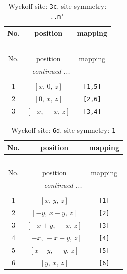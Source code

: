 \documentclass[fleqn,8pt]{jsarticle}
\begin{document}
\begin{longtable}{ccc}
\caption{Wyckoff site: {\tt 3c}, site symmetry: {\tt ..m'}}
 \\
 \hline \hline
No. & position & mapping \\ \hline \endfirsthead

\multicolumn{2}{l}{\tablename\ \thetable{}} \\
 \hline \hline
No. & position & mapping \\ \hline \endhead

 \hline \hline
\multicolumn{2}{r}{\footnotesize\it continued ...} \\ \endfoot

 \hline \hline
\multicolumn{2}{r}{} \\ \endlastfoot

1 & $\left[ x,\, 0,\, z \right]$ & {\tt [1,5]} \\ \hline
2 & $\left[ 0,\, x,\, z \right]$ & {\tt [2,6]} \\ \hline
3 & $\left[ - x,\, - x,\, z \right]$ & {\tt [3,4]} \\
\end{longtable}
\renewcommand{\arraystretch}{1.2}
\begin{longtable}{ccc}
\caption{Wyckoff site: {\tt 6d}, site symmetry: {\tt 1}}
 \\
 \hline \hline
No. & position & mapping \\ \hline \endfirsthead

\multicolumn{2}{l}{\tablename\ \thetable{}} \\
 \hline \hline
No. & position & mapping \\ \hline \endhead

 \hline \hline
\multicolumn{2}{r}{\footnotesize\it continued ...} \\ \endfoot

 \hline \hline
\multicolumn{2}{r}{} \\ \endlastfoot

1 & $\left[ x,\, y,\, z \right]$ & {\tt [1]} \\ \hline
2 & $\left[ - y,\, x - y,\, z \right]$ & {\tt [2]} \\ \hline
3 & $\left[ - x + y,\, - x,\, z \right]$ & {\tt [3]} \\ \hline
4 & $\left[ - x,\, - x + y,\, z \right]$ & {\tt [4]} \\ \hline
5 & $\left[ x - y,\, - y,\, z \right]$ & {\tt [5]} \\ \hline
6 & $\left[ y,\, x,\, z \right]$ & {\tt [6]} \\
\end{longtable}
\end{document}

